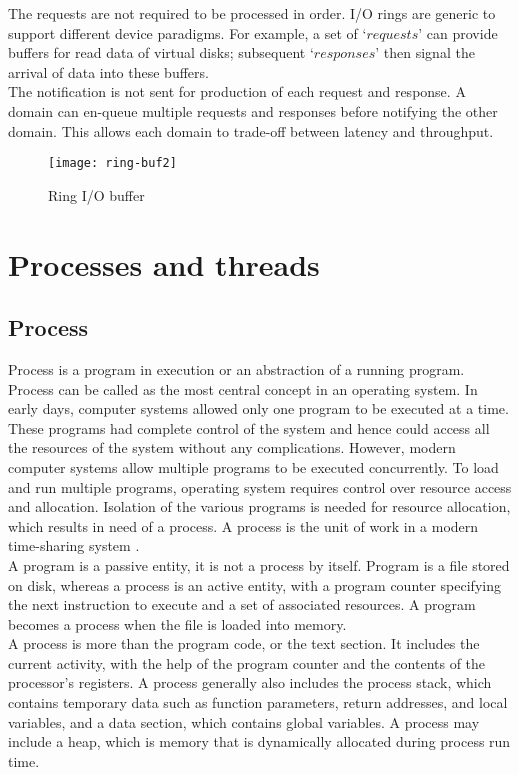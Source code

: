 The requests are not required to be processed in order. I/O rings are generic to support different device paradigms. For example, a set of $‘requests’$ can provide buffers for read data of virtual disks; subsequent $‘responses’$ then signal the arrival of data into these buffers. 
\\
The notification is not sent for production of each request and response. A domain can en-queue multiple requests and responses before notifying the other domain. This allows each domain to trade-off between latency and throughput.

\begin{figure}[!ht]
\centering
\texttt{[image: ring-buf2]}
\caption{Ring I/O buffer}
\label{fig:Ring buffer}
\end{figure}
\pagebreak

\section{Processes and threads}

\subsection{Process}

Process is a program in execution or an abstraction of a running program. Process can be called as the most central concept in an operating system. In early days, computer systems allowed only one program to be executed at a time. These programs had complete control of the system and hence could access all the resources of the system without any complications. However, modern computer systems allow multiple programs to be executed concurrently. To load and run multiple programs, operating system requires control over resource access and allocation. Isolation of the various programs is needed for resource allocation, which results in need of a process. A process is the unit of work in a modern time-sharing system \cite{Galvin}.
\\
A program is a passive entity, it is not a process by itself. Program is a file stored on disk, whereas a process is an active entity, with a program counter specifying the next instruction to execute and a set of associated resources. A program becomes a process when the file is loaded into memory\cite{Galvin}.
\\
A process is more than the program code, or the text section. It includes the current activity, with the help of the program counter and the contents of the processor's registers. A process generally also includes the process stack, which contains temporary data such as function parameters, return addresses, and local variables, and a data section, which contains global variables. A process may include a heap, which is memory that is dynamically allocated during process run time\cite{Galvin}.

